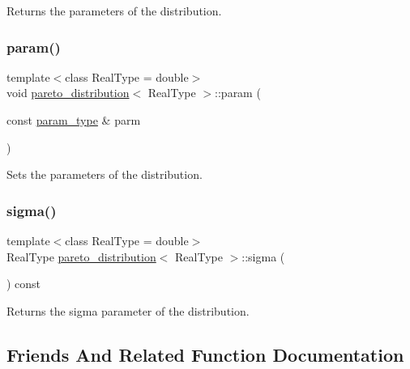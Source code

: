 Returns the parameters of the distribution. 

\mbox{\label{classpareto__distribution_aea6ab161e197e7350f5477492d00fe59}} 
\subsubsection{\texorpdfstring{param()}{param()}\hspace{0.1cm}{\footnotesize\ttfamily [2/2]}}
{\footnotesize\ttfamily template$<$class Real\+Type  = double$>$ \\
void \mbox{\hyperlink{classpareto__distribution}{pareto\+\_\+distribution}}$<$ Real\+Type $>$\+::param (\begin{DoxyParamCaption}\item[{const \mbox{\hyperlink{classpareto__distribution_1_1param__type}{param\+\_\+type}} \&}]{parm }\end{DoxyParamCaption})\hspace{0.3cm}{\ttfamily [inline]}}



Sets the parameters of the distribution. 

\mbox{\label{classpareto__distribution_a739d59031c3fd72af690ec68c1073afc}} 
\subsubsection{\texorpdfstring{sigma()}{sigma()}}
{\footnotesize\ttfamily template$<$class Real\+Type  = double$>$ \\
Real\+Type \mbox{\hyperlink{classpareto__distribution}{pareto\+\_\+distribution}}$<$ Real\+Type $>$\+::sigma (\begin{DoxyParamCaption}{ }\end{DoxyParamCaption}) const\hspace{0.3cm}{\ttfamily [inline]}}



Returns the sigma parameter of the distribution. 



\subsection{Friends And Related Function Documentation}
\mbox{\label{classpareto__distribution_a827211558343a83cda447b5ab8cce83a}} 
